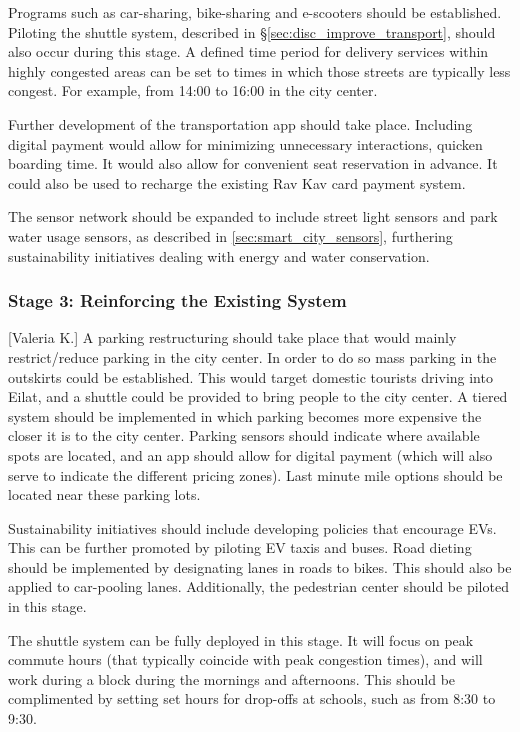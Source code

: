\documentclass[12pt]{article}                               %
\begin{document}
Programs such as car-sharing, bike-sharing and e-scooters should be established. Piloting the shuttle system, described in \S\ref{sec:disc_improve_transport}, should also occur during this stage. A defined time period for delivery services within highly congested areas can be set to times in which those streets are typically less congest. For example, from 14:00 to 16:00 in the city center. 

Further development of the transportation app should take place. Including digital payment would allow for minimizing unnecessary interactions, quicken boarding time. It would also allow for convenient seat reservation in advance. It could also be used to recharge the existing Rav Kav card payment system.

The sensor network should be expanded to include street light sensors and park water usage sensors, as described in \ref{sec:smart_city_sensors}, furthering sustainability initiatives dealing with energy and water conservation.

\subsubsection{Stage 3: Reinforcing the Existing System}[Valeria K.]
A parking restructuring should take place that would mainly restrict/reduce parking in the city center. In order to do so mass parking in the outskirts could be established. This would target domestic tourists driving into Eilat, and a shuttle could be provided to bring people to the city center. A tiered system should be implemented in which parking becomes more expensive the closer it is to the city center. Parking sensors should indicate where available spots are located, and an app should allow for digital payment (which will also serve to indicate the different pricing zones). Last minute mile options should be located near these parking lots.

Sustainability initiatives should include developing policies that encourage EVs. This can be further promoted by piloting EV taxis and buses. Road dieting should be implemented by designating lanes in roads to bikes. This should also be applied to car-pooling lanes. Additionally, the pedestrian center should be piloted in this stage.

The shuttle system can be fully deployed in this stage. It will focus on peak commute hours (that typically coincide with peak congestion times), and will work during a block during the mornings and afternoons. This should be complimented by setting set hours for drop-offs at schools, such as from 8:30 to 9:30.
\end{document}
